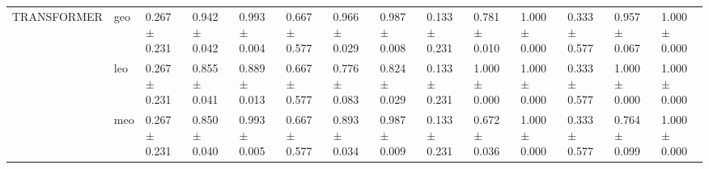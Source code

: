 \begin{table}
\begin{tabular}{llllllllllllll}
\cline{1-14}
\multirow[t]{3}{*}{TRANSFORMER} & geo & 0.267 $\pm$ 0.231 & 0.942 $\pm$ 0.042 & 0.993 $\pm$ 0.004 & 0.667 $\pm$ 0.577 & 0.966 $\pm$ 0.029 & 0.987 $\pm$ 0.008 & 0.133 $\pm$ 0.231 & 0.781 $\pm$ 0.010 & 1.000 $\pm$ 0.000 & 0.333 $\pm$ 0.577 & 0.957 $\pm$ 0.067 & 1.000 $\pm$ 0.000 \\
 & leo & 0.267 $\pm$ 0.231 & 0.855 $\pm$ 0.041 & 0.889 $\pm$ 0.013 & 0.667 $\pm$ 0.577 & 0.776 $\pm$ 0.083 & 0.824 $\pm$ 0.029 & 0.133 $\pm$ 0.231 & 1.000 $\pm$ 0.000 & 1.000 $\pm$ 0.000 & 0.333 $\pm$ 0.577 & 1.000 $\pm$ 0.000 & 1.000 $\pm$ 0.000 \\
 & meo & 0.267 $\pm$ 0.231 & 0.850 $\pm$ 0.040 & 0.993 $\pm$ 0.005 & 0.667 $\pm$ 0.577 & 0.893 $\pm$ 0.034 & 0.987 $\pm$ 0.009 & 0.133 $\pm$ 0.231 & 0.672 $\pm$ 0.036 & 1.000 $\pm$ 0.000 & 0.333 $\pm$ 0.577 & 0.764 $\pm$ 0.099 & 1.000 $\pm$ 0.000 \\
\cline{1-14}
\bottomrule
\end{tabular}
\end{table}
